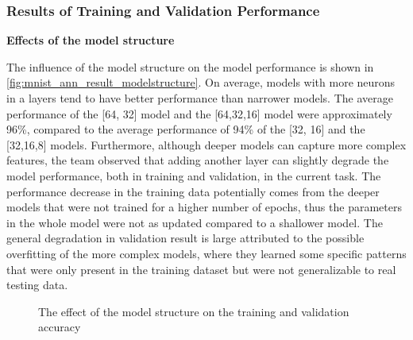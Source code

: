 \documentclass[a4paper]{article}
\begin{document}
\subsubsection{Results of Training and Validation Performance} \label{ann_model_result_hyperparameter}
\textbf{Effects of the model structure}

The influence of the model structure on the model performance is shown in \autoref{fig:mnist_ann_result_modelstructure}. On average, models with more neurons in a layers tend to have better performance than narrower models. The average performance of the [64, 32] model and the [64,32,16] model were approximately 96\%, compared to the average performance of 94\% of the [32, 16] and the [32,16,8] models. Furthermore, although deeper models can capture more complex features, the team observed that adding another layer can slightly degrade the model performance, both in training and validation, in the current task. The performance decrease in the training data potentially comes from the deeper models that were not trained for a higher number of epochs, thus the parameters in the whole model were not as updated compared to a shallower model. The general degradation in validation result is large attributed to the possible overfitting of the more complex models, where they learned some specific patterns that were only present in the training dataset but were not generalizable to real testing data.

\begin{figure} [htbp]
    \caption{The effect of the model structure on the training and validation accuracy} 
    \label{fig:mnist_ann_result_modelstructure}
\end{figure}
\end{document}
